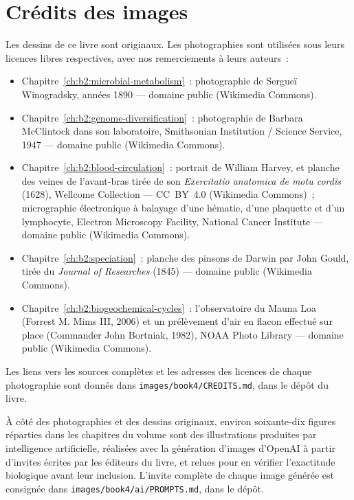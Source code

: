 \chapter*{Crédits des images}

\begingroup\sloppy

Les dessins de ce livre sont originaux. Les photographies sont
utilisées sous leurs licences libres respectives, avec nos
remerciements à leurs auteurs~:

\begin{itemize}
  \item Chapitre~\ref{ch:b2:microbial-metabolism}~: photographie de
        Sergueï Winogradsky, années 1890 --- domaine public (Wikimedia
        Commons).
  \item Chapitre~\ref{ch:b2:genome-diversification}~: photographie de
        Barbara McClintock dans son laboratoire, Smithsonian Institution
        / Science Service, 1947 --- domaine public (Wikimedia Commons).
  \item Chapitre~\ref{ch:b2:blood-circulation}~: portrait de William
        Harvey, et planche des veines de l'avant-bras tirée de son
        \emph{Exercitatio anatomica de motu cordis} (1628), Wellcome
        Collection --- CC~BY~4.0 (Wikimedia Commons)~; micrographie
        électronique à balayage d'une hématie, d'une plaquette et d'un
        lymphocyte, Electron Microscopy Facility, National Cancer
        Institute --- domaine public (Wikimedia Commons).
  \item Chapitre~\ref{ch:b2:speciation}~: planche des pinsons de Darwin
        par John Gould, tirée du \emph{Journal of Researches} (1845) ---
        domaine public (Wikimedia Commons).
  \item Chapitre~\ref{ch:b2:biogeochemical-cycles}~: l'observatoire du
        Mauna Loa (Forrest M. Mims III, 2006) et un prélèvement d'air en
        flacon effectué sur place (Commander John Bortniak, 1982), NOAA
        Photo Library --- domaine public (Wikimedia Commons).
\end{itemize}

Les liens vers les sources complètes et les adresses des licences de
chaque photographie sont donnés dans
\texttt{images/\allowbreak book4/\allowbreak CREDITS.md}, dans le dépôt du livre.

\bigskip
À côté des photographies et des dessins originaux, environ
soixante-dix figures réparties dans les chapitres du volume
sont des illustrations produites par intelligence artificielle,
réalisées avec la génération d'images d'OpenAI à partir d'invites
écrites par les éditeurs du livre, et relues pour en vérifier
l'exactitude biologique avant leur inclusion. L'invite complète de chaque image générée est
consignée dans \texttt{images/\allowbreak book4/\allowbreak ai/\allowbreak PROMPTS.md},
dans le dépôt.
\par\endgroup
\clearpage
